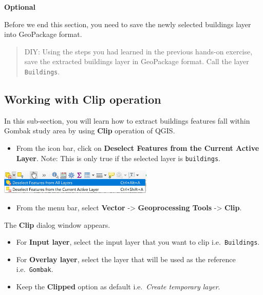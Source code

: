 \documentclass[
  letterpaper,
  DIV=11,
  numbers=noendperiod]{scrreprt}
\providecommand{\tightlist}{%
  \setlength{\itemsep}{0pt}\setlength{\parskip}{0pt}}\usepackage{longtable,booktabs,array}
\begin{document}
\textbf{Optional}

Before we end this section, you need to save the newly selected
buildings layer into GeoPackage format.

\begin{quote}
DIY: Using the steps you had learned in the previous hands-on exercise,
save the extracted buildings layer in GeoPackage format. Call the layer
\texttt{Buildings}.
\end{quote}

\hypertarget{working-with-clip-operation}{%
\subsection{Working with Clip
operation}\label{working-with-clip-operation}}

In this sub-section, you will learn how to extract buildings features
fall within Gombak study area by using \textbf{Clip} operation of QGIS.

\begin{itemize}
\tightlist
\item
  From the icon bar, click on \textbf{Deselect Features from the Current
  Active Layer}. Note: This is only true if the selected layer is
  \texttt{buildings}.
\end{itemize}

\includegraphics[width=0.55\textwidth,height=\textheight]{./img07/image14.jpg}

\begin{itemize}
\tightlist
\item
  From the menu bar, select \textbf{Vector} -\textgreater{}
  \textbf{Geoprocessing Tools} -\textgreater{} \textbf{Clip}.
\end{itemize}

The \textbf{Clip} dialog window appears.

\begin{itemize}
\tightlist
\item
  For \textbf{Input layer}, select the input layer that you want to clip
  i.e.~\texttt{Buildings}.
\item
  For \textbf{Overlay layer}, select the layer that will be used as the
  reference i.e.~\texttt{Gombak}.
\item
  Keep the \textbf{Clipped} option as default i.e.~\emph{Create
  temporary layer}.
\end{itemize}
\end{document}
